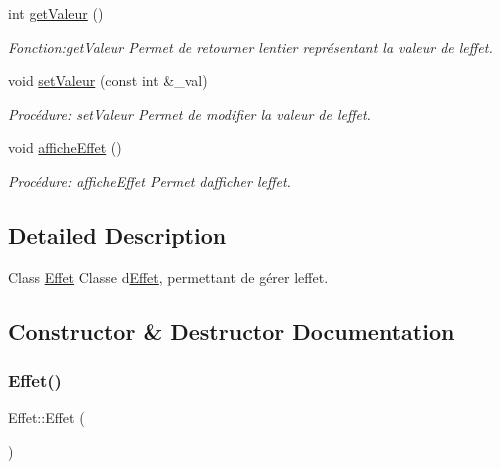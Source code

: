 \begin{DoxyCompactItemize}
int \hyperlink{classEffet_ab47e7ca4baed53d6955ad59a41d79538}{get\+Valeur} ()
\begin{DoxyCompactList}\small\item\em Fonction\+:get\+Valeur Permet de retourner l\textquotesingle{}entier représentant la valeur de l\textquotesingle{}effet. \end{DoxyCompactList}\item 
void \hyperlink{classEffet_a3d22eeba4c86d9f45e75d64e639d4e37}{set\+Valeur} (const int \&\+\_\+val)
\begin{DoxyCompactList}\small\item\em Procédure\+: set\+Valeur Permet de modifier la valeur de l\textquotesingle{}effet. \end{DoxyCompactList}\item 
void \hyperlink{classEffet_a038370be360fcb5e11f5d654e3506d42}{affiche\+Effet} ()
\begin{DoxyCompactList}\small\item\em Procédure\+: affiche\+Effet Permet d\textquotesingle{}afficher l\textquotesingle{}effet. \end{DoxyCompactList}\end{DoxyCompactItemize}


\subsection{Detailed Description}
Class \hyperlink{classEffet}{Effet} Classe d\textquotesingle{}\hyperlink{classEffet}{Effet}, permettant de gérer l\textquotesingle{}effet. 

\subsection{Constructor \& Destructor Documentation}
\mbox{\label{classEffet_a79744b45fc5715a4742e63565d4f89cb}} 
\subsubsection{\texorpdfstring{Effet()}{Effet()}\hspace{0.1cm}{\footnotesize\ttfamily [1/3]}}
{\footnotesize\ttfamily Effet\+::\+Effet (\begin{DoxyParamCaption}{ }\end{DoxyParamCaption})}



